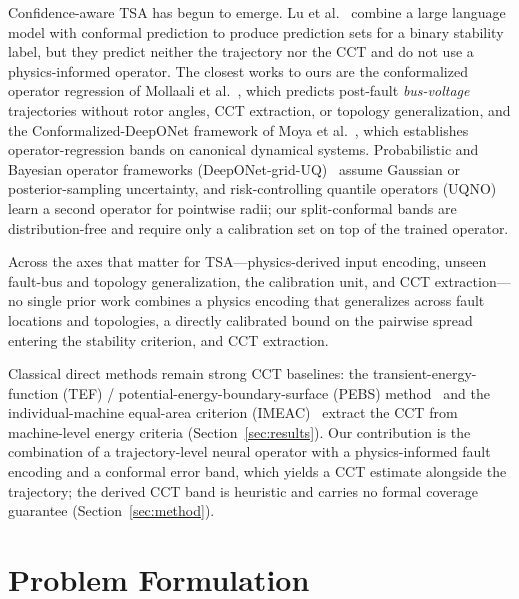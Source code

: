 \documentclass[5p,times]{elsarticle}
\begin{document}
Confidence-aware TSA has begun to emerge. Lu et al.~\cite{lu2026confidence} combine a large
language model with conformal prediction to produce prediction sets for a binary stability label,
but they predict neither the trajectory nor the CCT and do not use a physics-informed operator.
The closest works to ours are the conformalized operator regression of Mollaali et
al.~\cite{mollaali2025conformalized}, which predicts post-fault \emph{bus-voltage} trajectories
without rotor angles, CCT extraction, or topology generalization, and the Conformalized-DeepONet
framework of Moya et al.~\cite{moya2025conformal}, which establishes operator-regression bands on
canonical dynamical systems. Probabilistic and Bayesian operator frameworks
(DeepONet-grid-UQ)~\cite{moya2023deeponet} assume Gaussian or posterior-sampling uncertainty,
and risk-controlling quantile operators (UQNO)~\cite{ma2024calibrated} learn a second operator
for pointwise radii; our split-conformal bands are distribution-free and require only a
calibration set on top of the trained operator.

Across the axes that matter for TSA---physics-derived input encoding, unseen fault-bus and
topology generalization, the calibration unit, and CCT extraction---no single prior work combines
a physics encoding that generalizes across fault locations and topologies, a directly calibrated
bound on the pairwise spread entering the stability criterion, and CCT extraction.

Classical direct methods remain strong CCT baselines: the transient-energy-function (TEF) / potential-energy-boundary-surface (PEBS)
method~\cite{athay1979transient} and the individual-machine equal-area criterion
(IMEAC)~\cite{wang2018individual} extract the CCT from machine-level energy criteria
(Section~\ref{sec:results}). Our contribution is the combination of a trajectory-level neural
operator with a physics-informed fault encoding and a conformal error band, which yields a CCT
estimate alongside the trajectory; the derived CCT band is heuristic and carries no formal
coverage guarantee (Section~\ref{sec:method}).

\section{Problem Formulation}
\label{sec:problem}
\end{document}
